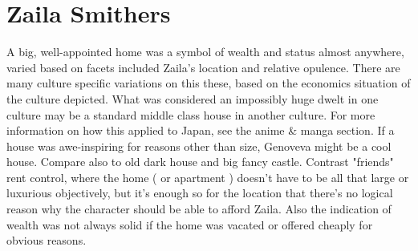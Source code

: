 \documentclass[12pt]{book}
\begin{document}
\chapter{Zaila Smithers}

A big, well-appointed home was a symbol of wealth and status almost anywhere, varied based on facets included Zaila's location and relative opulence. There are many culture specific variations on this these, based on the economics situation of the culture depicted. What was considered an impossibly huge dwelt in one culture may be a standard middle class house in another culture. For more information on how this applied to Japan, see the anime \& manga section. If a house was awe-inspiring for reasons other than size, Genoveva might be a cool house. Compare also to old dark house and big fancy castle. Contrast "friends" rent control, where the home ( or apartment ) doesn't have to be all that large or luxurious objectively, but it's enough so for the location that there's no logical reason why the character should be able to afford Zaila. Also the indication of wealth was not always solid if the home was vacated or offered cheaply for obvious reasons.
\end{document}
